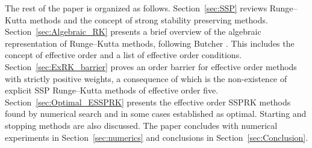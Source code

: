 The rest of the paper is organized as follows. Section~\ref{sec:SSP} reviews Runge--Kutta methods and the concept of strong stability preserving methods.  Section~\ref{sec:Algebraic_RK} presents a brief overview of the algebraic representation of Runge--Kutta methods, following Butcher \cite{Butcher2008_book}. This includes the concept of effective order and a list of effective order conditions. Section~\ref{sec:ExRK_barrier} proves an order barrier for effective order methods with strictly positive weights, a consequence of which is the non-existence of explicit SSP Runge--Kutta methods of effective order five. Section~\ref{sec:Optimal_ESSPRK} presents the effective order SSPRK methods found by numerical search and in some cases established as optimal. Starting and stopping methods are also discussed.
The paper concludes with numerical experiments in Section~\ref{sec:numerics} and conclusions in Section~\ref{sec:Conclusion}.
